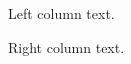 \documentclass{article}
\begin{document}
\noindent
\begin{minipage}{0.45\textwidth}
Left column text.
\end{minipage}
\hfill
\begin{minipage}{0.45\textwidth}
Right column text.
\end{minipage}
\end{document}
